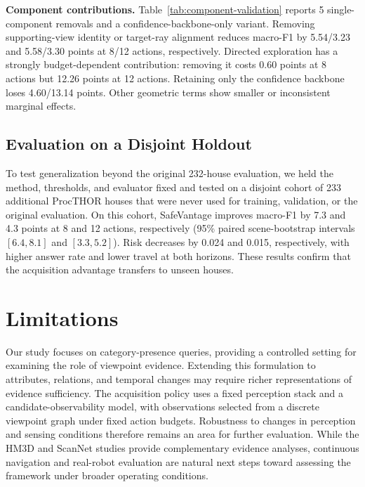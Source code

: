 \documentclass[letterpaper, 10 pt, conference]{ieeeconf}
\newcommand{\method}{SafeVantage}
\begin{document}
    \textbf{Component contributions.} Table~\ref{tab:component-validation} reports 5 single-component removals and a confidence-backbone-only variant. Removing supporting-view identity or target-ray alignment reduces macro-F1 by 5.54/3.23 and 5.58/3.30 points at 8/12 actions, respectively. Directed exploration has a strongly budget-dependent contribution: removing it costs 0.60 points at 8 actions but 12.26 points at 12 actions. Retaining only the confidence backbone loses 4.60/13.14 points. Other geometric terms show smaller or inconsistent marginal effects.
    

\subsection{Evaluation on a Disjoint Holdout}

To test generalization beyond the original 232-house evaluation, we held the method, thresholds, and evaluator fixed and tested on a disjoint cohort of 233 additional ProcTHOR houses that were never used for training, validation, or the original evaluation. On this cohort, \method{} improves macro-F1 by 7.3 and 4.3 points at 8 and 12 actions, respectively (95\% paired scene-bootstrap intervals $[6.4,8.1]$ and $[3.3,5.2]$). Risk decreases by 0.024 and 0.015, respectively, with higher answer rate and
lower travel at both horizons. These results confirm that the
acquisition advantage transfers to unseen houses.   

   
    
\section{Limitations}

Our study focuses on category-presence queries, providing a controlled setting for examining the role of viewpoint evidence. Extending this formulation to attributes, relations, and temporal changes may require richer representations of evidence sufficiency. The acquisition policy uses a fixed perception stack and a candidate-observability model, with observations selected from a discrete viewpoint graph under fixed action budgets. Robustness to changes in perception and sensing conditions therefore remains an area for further evaluation. While the HM3D and ScanNet studies provide complementary evidence analyses, continuous navigation and real-robot evaluation are natural next steps toward assessing the framework under broader operating conditions.
\end{document}
